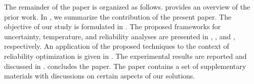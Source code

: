 The remainder of the paper is organized as follows.
 provides an overview of the prior work.
In , we summarize the contribution of the present paper.
The objective of our study is formulated in .
The proposed frameworks for uncertainty, temperature, and reliability analyses are presented in , , and , respectively.
An application of the proposed techniques to the context of reliability optimization is given in .
The experimental results are reported and discussed in .
 concludes the paper.
The paper contains a set of supplementary materials with discussions on certain aspects of our solutions.
